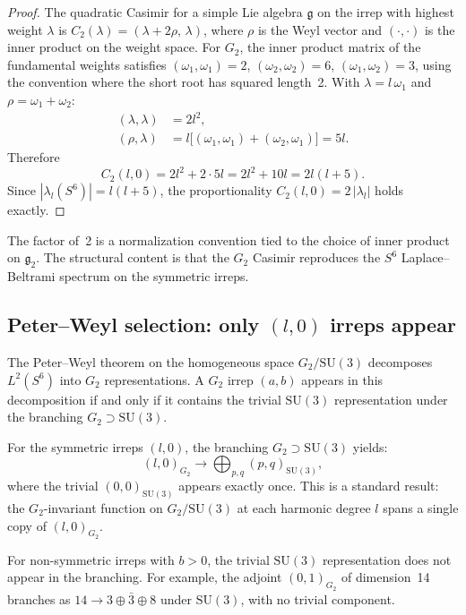 \documentclass[twocolumn,pra,amsmath,amssymb,superscriptaddress]{revtex4-2}
\begin{document}
\begin{proof}
The quadratic Casimir for a simple Lie algebra $\mathfrak{g}$ on
the irrep with highest weight $\lambda$ is
$C_2(\lambda) = (\lambda + 2\rho,\, \lambda)$,
where $\rho$ is the Weyl vector and $(\cdot,\cdot)$ is the inner
product on the weight space.  For $G_2$, the inner product matrix
of the fundamental weights satisfies
$(\omega_1,\omega_1) = 2$, $(\omega_2,\omega_2) = 6$,
$(\omega_1,\omega_2) = 3$,
using the convention where the short root has squared length~2.
With $\lambda = l\,\omega_1$ and $\rho = \omega_1 + \omega_2$:
\begin{align}
(\lambda,\lambda) &= 2l^2, \\
(\rho,\lambda) &= l\bigl[(\omega_1,\omega_1) + (\omega_2,\omega_1)\bigr]
= 5l.
\end{align}
Therefore
\begin{equation}
C_2(l,0) = 2l^2 + 2 \cdot 5l = 2l^2 + 10l = 2l(l+5).
\end{equation}
Since $|\lambda_l(S^6)| = l(l+5)$, the proportionality
$C_2(l,0) = 2\,|\lambda_l|$ holds exactly.
\end{proof}

The factor of~2 is a normalization convention tied to the choice
of inner product on $\mathfrak{g}_2$.  The structural content is
that the $G_2$ Casimir reproduces the $S^6$ Laplace--Beltrami
spectrum on the symmetric irreps.

\subsection{Peter--Weyl selection: only $(l,0)$ irreps appear}

The Peter--Weyl theorem on the homogeneous space $G_2/\mathrm{SU}(3)$
decomposes $L^2(S^6)$ into $G_2$ representations.  A $G_2$ irrep
$(a,b)$ appears in this decomposition if and only if it contains
the trivial $\mathrm{SU}(3)$ representation under the branching
$G_2 \supset \mathrm{SU}(3)$.

For the symmetric irreps $(l,0)$, the branching
$G_2 \supset \mathrm{SU}(3)$ yields:
\begin{equation}
(l,0)_{G_2} \to \bigoplus_{p,q} (p,q)_{\mathrm{SU}(3)},
\end{equation}
where the trivial $(0,0)_{\mathrm{SU}(3)}$ appears exactly once.
This is a standard result: the $G_2$-invariant function on
$G_2/\mathrm{SU}(3)$ at each harmonic degree $l$ spans a single
copy of $(l,0)_{G_2}$.

For non-symmetric irreps with $b > 0$, the trivial
$\mathrm{SU}(3)$ representation does not appear in the branching.
For example, the adjoint $(0,1)_{G_2}$ of dimension~14 branches as
$14 \to 3 \oplus \bar{3} \oplus 8$ under $\mathrm{SU}(3)$, with no
trivial component.
\end{document}
